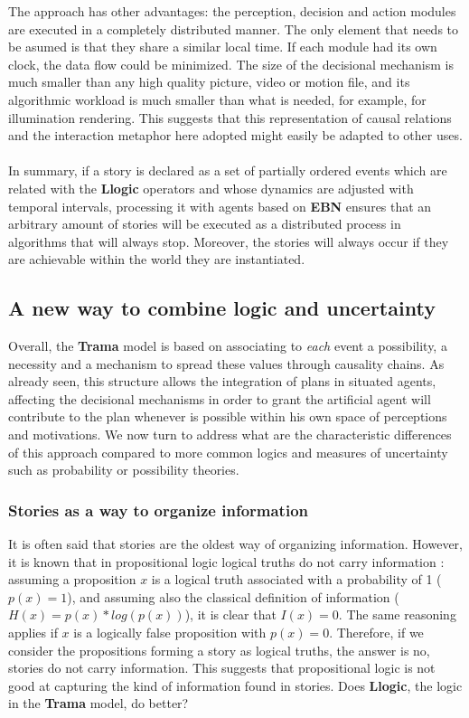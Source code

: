 \documentclass[
		twoside,openright,titlepage,numbers=noenddot,manychapters,
		headinclude,%
                footinclude=false,cleardoublepage=empty,
                BCOR=5mm,
		fontsize=11pt, %
                 enabledeprecatedfontcommands]{scrreprt}
\begin{document}
The approach has other advantages: the perception, decision and action modules are executed in a completely distributed manner. The only element that needs to be asumed is that they share a similar local time. If each module had its own clock, the data flow could be minimized. The size of the decisional mechanism is much smaller than any high quality picture, video or motion file, and its algorithmic workload is much smaller than what is needed, for example, for illumination rendering. This suggests that this representation of causal relations and the interaction metaphor here adopted might easily be adapted to other uses.
\\
\\
In summary, if a story is declared as a set of partially ordered events which are related with the \textbf{Llogic} operators and whose dynamics are adjusted with temporal intervals, processing it with agents based on \textbf{EBN} ensures that an arbitrary amount of stories will be executed as a distributed process in algorithms that will always stop. Moreover, the stories will always occur if they are achievable within the world they are instantiated. 



\subsection{A new way to combine logic and uncertainty}


Overall, the \textbf{Trama} model is based on associating to \emph{each} event a possibility, a necessity and a mechanism to spread these values through causality chains. As already seen, this structure allows the integration of plans in situated agents, affecting the decisional mechanisms in order to grant the artificial agent will contribute to the plan whenever is possible within his own space of perceptions and motivations.  
We now turn to address what are the characteristic differences of this approach compared to more common logics and measures of uncertainty such as probability or possibility theories.



\subsubsection{Stories as a way to organize information}


 \label{stories_info}
 
 It is often said that stories are the oldest way of organizing information.
 However, it is known that in propositional logic logical truths do not carry information \cite[]{bremer2003ltc}: assuming a proposition $x$ is a logical truth associated with a probability of 1 ($p(x)=1$), and assuming also the classical definition of information ($H(x)=p(x)*log(p(x))$), it is clear that $I(x)=0$. The same reasoning applies if $x$ is a logically false proposition with $p(x)=0$. Therefore, if we consider the propositions forming a story as logical truths, the answer is no, stories do not carry information. This suggests that propositional logic is not good at capturing the kind of information found in stories. Does \textbf{Llogic}, the logic in the \textbf{Trama} model, do better? 
\end{document}
